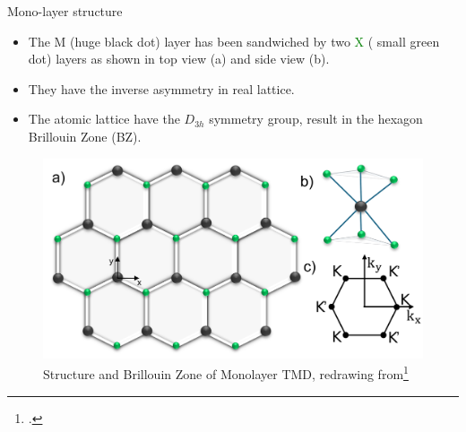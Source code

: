 \documentclass{beamer}
\begin{document}
\begin{frame}{Mono-layer structure}
\begin{multicols}{2}
	\begin{itemize}
\item The M (huge black dot) layer has been sandwiched by two \textcolor{green}{X} ( small green dot) layers as shown in top view (a) and side view (b).\\
\item They have the inverse asymmetry in real lattice.\\
\item The atomic lattice have the $D_{3h}$ symmetry group, result in the hexagon Brillouin Zone (BZ).
	\end{itemize}
	\columnbreak
	\vfill
	\begin{figure}
\label{Structure}
\includegraphics[width = \linewidth]{images/RS.pdf}
\caption{Structure and Brillouin Zone of Monolayer TMD, redrawing from\footcite{liu_three-band_2013}}
	\end{figure}
\end{multicols}
\end{frame}
\end{document}
